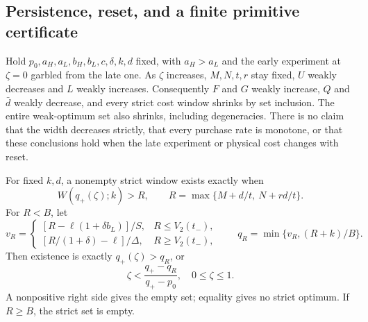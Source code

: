 \subsection{Persistence, reset, and a finite primitive certificate}\label{sec:resetregions}
\begin{proposition}\label{prop:resetregion}
Hold $p_0,a_H,a_L,b_H,b_L,c,\delta,k,d$ fixed, with $a_H>a_L$ and the early experiment at $\zeta=0$ garbled from the late one. As $\zeta$ increases, $M,N,t,r$ stay fixed, $U$ weakly decreases and $L$ weakly increases. Consequently $F$ and $G$ weakly increase, $Q$ and $\bar d$ weakly decrease, and every strict cost window shrinks by set inclusion. The entire weak-optimum set also shrinks, including degeneracies. There is no claim that the width decreases strictly, that every purchase rate is monotone, or that these conclusions hold when the late experiment or physical cost changes with reset.

For fixed $k,d$, a nonempty strict window exists exactly when
\begin{equation}
 W(q_+(\zeta);k)>R,\qquad
 R=\max\{M+d/t,\ N+rd/t\}.\label{eq:Rreset}
\end{equation}
For $R<B$, let
\begin{equation}
 v_R=\begin{cases}
 [R-\ell(1+\delta b_L)]/S,&R\leq V_2(t_-),\\
 [R/(1+\delta)-\ell]/\Delta,&R\geq V_2(t_-),
 \end{cases}\qquad q_R=\min\{v_R,(R+k)/B\}.\label{eq:inverse}
\end{equation}
Then existence is exactly $q_+(\zeta)>q_R$, or
\begin{equation}
 \zeta<\frac{q_+-q_R}{q_+-p_0},\quad 0\leq\zeta\leq1.\label{eq:zetacrit}
\end{equation}
A nonpositive right side gives the empty set; equality gives no strict optimum. If $R\geq B$, the strict set is empty.
\end{proposition}
